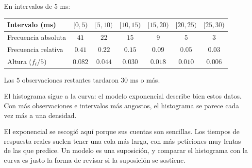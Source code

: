 \documentclass[11pt,letterpaper]{article}
\begin{document}
\begin{ejemplo}
    En intervalos de $5$ ms:
    \begin{center}
    \small
    \begin{tabular}{lcccccc}
        \toprule
        \textbf{Intervalo (ms)} & $[0, 5)$ & $[5, 10)$ & $[10, 15)$
        & $[15, 20)$ & $[20, 25)$ & $[25, 30)$ \\
        \midrule
        Frecuencia absoluta & $41$ & $22$ & $15$ & $9$ & $5$ & $3$ \\
        Frecuencia relativa & $0.41$ & $0.22$ & $0.15$ & $0.09$
                            & $0.05$ & $0.03$ \\
        Altura ($f_i / 5$)  & $0.082$ & $0.044$ & $0.030$ & $0.018$
                            & $0.010$ & $0.006$ \\
        \bottomrule
    \end{tabular}
    \end{center}
    Las $5$ observaciones restantes tardaron $30$ ms o más.
    \begin{center}
    \end{center}
    El histograma sigue a la curva: el modelo exponencial describe
    bien estos datos. Con más observaciones e intervalos más angostos,
    el histograma se parece cada vez más a una densidad.
\end{ejemplo}

\begin{ojo}
    El exponencial se escogió aquí porque sus cuentas son sencillas.
    Los tiempos de respuesta reales suelen tener una cola más larga, con
    más peticiones muy lentas de las que predice. Un modelo es una
    suposición, y comparar el histograma con la curva es justo la forma
    de revisar si la suposición se sostiene.
\end{ojo}
\end{document}
